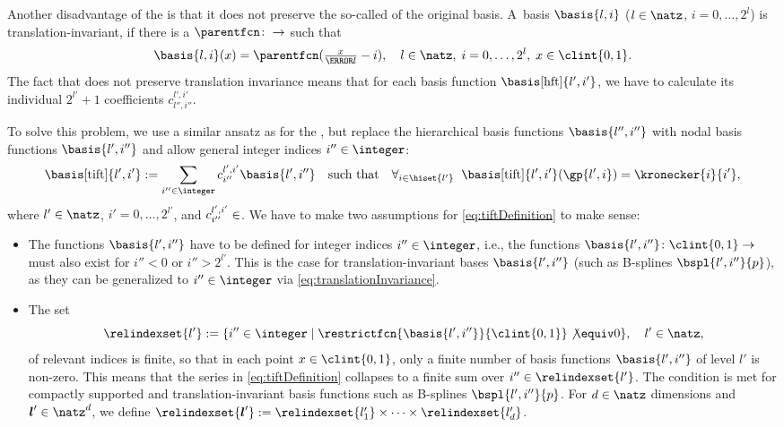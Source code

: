 Another disadvantage of the \hftr is that it does not preserve
the so-called  of the original basis.
A~basis $\basis{l,i}$ ($l \in \natz$, $i = 0, \dotsc, 2^l$)
is translation-invariant, if there is a 
$\parentfcn\colon \real \to \real$
such that
\begin{equation}
  \label{eq:translationInvariance}
  \basis{l,i}(x)
  = \parentfcn(\tfrac{x}{\ms{l}} - i),\quad
  l \in \natz,\;
  i = 0, \dotsc, 2^l,\;
  x \in \clint{0, 1}.
\end{equation}
The fact that \hftr does not preserve translation invariance means
that for each basis function $\basis[\hft]{l',i'}$, we have to
calculate its individual $2^{l'} + 1$ coefficients $c_{l'',i''}^{l',i'}$.

To solve this problem,
we use a similar ansatz as for the \hftr,
but replace the hierarchical basis functions $\basis{l'',i''}$
with nodal basis functions $\basis{l',i''}$ and
allow general integer indices $i'' \in \integer$:
\begin{equation}
  \label{eq:tiftDefinition}
  \basis[\tift]{l',i'}
  := \sum_{i'' \in \integer} c_{i''}^{l',i'} \basis{l',i''}
  \quad\text{such that}\quad
  \falarge{i \in \hiset{l'}}{
    \basis[\tift]{l',i'}(\gp{l',i}) = \kronecker{i}{i'},
  }
\end{equation}
where $l' \in \natz$, $i' = 0, \dotsc, 2^{l'}$, and
$c_{i''}^{l',i'} \in \real$.
We have to make two assumptions for \eqref{eq:tiftDefinition} to make sense:

\begin{itemize}
  \item
  The functions $\basis{l',i''}$ have to be defined for integer indices
  $i'' \in \integer$, i.e.,
  the functions $\basis{l',i''}\colon \clint{0, 1} \to \real$
  must also exist for $i'' < 0$ or $i'' > 2^{l'}$.
  This is the case for translation-invariant bases
  $\basis{l',i''}$ (such as B-splines $\bspl{l',i''}{p}$),
  as they can be generalized to $i'' \in \integer$
  via \cref{eq:translationInvariance}.
  
  \item
  The set
  \begin{equation}
    \relindexset{l'}
    := \{i'' \in \integer \mid
    \restrictfcn{\basis{l',i''}}{\clint{0, 1}} \not\equiv 0\},\quad
    l' \in \natz,
  \end{equation}
  of relevant indices is finite, so that in each point $x \in \clint{0, 1}$,
  only a finite number of basis functions $\basis{l',i''}$ of level $l'$
  is non-zero.
  This means that the series in \eqref{eq:tiftDefinition} collapses to a
  finite sum over $i'' \in \relindexset{l'}$.
  The condition is met for compactly supported and translation-invariant
  basis functions such as B-splines $\bspl{l',i''}{p}$.
  For $d \in \natz$ dimensions and $\*l' \in \natz^d$, we define
  $\relindexset{\*l'} :=
  \relindexset{l'_1} \times \dotsb \times \relindexset{l'_d}$.
\end{itemize}

